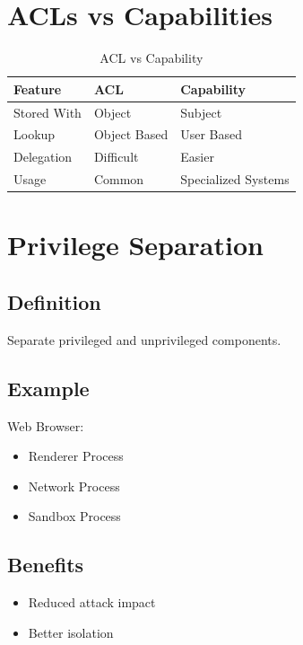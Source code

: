 \section{ACLs vs Capabilities}

\begin{table}[h]
\centering
\begin{tabular}{|p{5cm}|p{4cm}|p{4cm}|}
\hline
Feature & ACL & Capability \\
\hline
Stored With & Object & Subject \\
\hline
Lookup & Object Based & User Based \\
\hline
Delegation & Difficult & Easier \\
\hline
Usage & Common & Specialized Systems \\
\hline
\end{tabular}
\caption{ACL vs Capability}
\end{table}

\section{Privilege Separation}

\subsection{Definition}

Separate privileged and unprivileged components.

\subsection{Example}

Web Browser:

\begin{itemize}
\item Renderer Process
\item Network Process
\item Sandbox Process
\end{itemize}

\subsection{Benefits}

\begin{itemize}
\item Reduced attack impact
\item Better isolation
\end{itemize}

